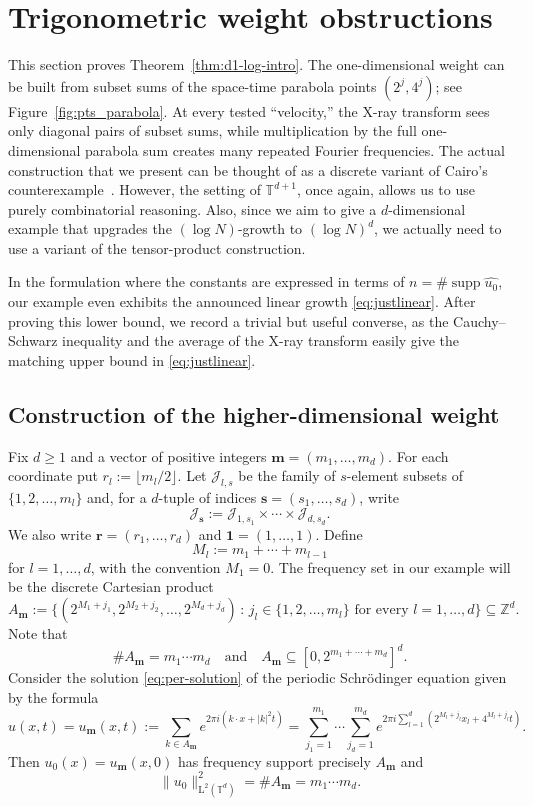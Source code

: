 \documentclass[11pt,reqno]{amsart}
\numberwithin{equation}{section}
\newcommand{\supp}{\operatorname{supp}}
\renewcommand{\ge}{\geqslant}
\begin{document}
\section{Trigonometric weight obstructions}
\label{sec:d1-log-weight}

This section proves Theorem~\ref{thm:d1-log-intro}. 
The one-dimensional weight can be built from subset sums of the space-time parabola points $(2^j,4^j)$; see Figure~\ref{fig:pts_parabola}. At every tested ``velocity,'' the X-ray transform sees only diagonal pairs of subset sums, while multiplication by the full one-dimensional parabola sum creates many repeated Fourier frequencies. 
The actual construction that we present can be thought of as a discrete variant of Cairo's counterexample~\cite{Cairo}. However, the setting of $\mathbb{T}^{d+1}$, once again, allows us to use purely combinatorial reasoning.
Also, since we aim to give a $d$-dimensional example that upgrades the $(\log N)$-growth to $(\log N)^d$, we actually need to use a variant of the tensor-product construction.

In the formulation where the constants are expressed in terms of $n=\#\supp\widehat{u_0}$, our example even exhibits the announced linear growth \eqref{eq:justlinear}. 
After proving this lower bound, we record a trivial but useful converse, as the Cauchy--Schwarz inequality and the average of the X-ray transform easily give the matching upper bound in \eqref{eq:justlinear}.

\subsection{Construction of the higher-dimensional weight}
Fix $d\ge1$ and a vector of positive integers $\mathbf{m}=(m_1,\ldots,m_d)$.
For each coordinate put $r_l:=\lfloor m_l/2\rfloor$. Let $\mathcal{J}_{l,s}$ be the family of $s$-element subsets of $\{1,2,\ldots,m_l\}$ and, for a $d$-tuple of indices $\mathbf{s}=(s_1,\ldots,s_d)$, write 
\[ \mathcal{J}_{\mathbf{s}}:=\mathcal{J}_{1,s_1}\times\cdots\times\mathcal{J}_{d,s_d}. \]
We also write $\mathbf{r}=(r_1,\ldots,r_d)$ and $\mathbf{1}=(1,\ldots,1)$.
Define
\[ M_l:=m_1+\cdots+m_{l-1} \]
for $l=1,\ldots,d$, with the convention $M_1=0$. The frequency set in our example will be the discrete Cartesian product
\[ A_{\mathbf{m}} := \bigl\{(2^{M_1+j_1},2^{M_2+j_2},\ldots,2^{M_d+j_d}) \,:\, j_l\in\{1,2,\ldots,m_l\}\text{ for every }l=1,\ldots,d\bigr\} \subseteq\mathbb{Z}^d. \]
Note that
\[ \#A_{\mathbf{m}}=m_1\cdots m_d \quad\text{and}\quad A_{\mathbf{m}}\subseteq[0,2^{m_1+\cdots+m_d}]^d. \]
Consider the solution \eqref{eq:per-solution} of the periodic Schr\"{o}dinger equation given by the formula
\begin{equation}\label{eq:logNsolution}
u(x,t) = u_{\mathbf{m}}(x,t) :=\sum_{k\in A_{\mathbf{m}}}e^{2\pi i(k\cdot x+|k|^2t)}
= \sum_{j_1=1}^{m_1} \cdots \sum_{j_d=1}^{m_d} e^{2\pi i\sum_{l=1}^d (2^{M_l+j_l}x_l+4^{M_l+j_l}t)}.
\end{equation}
Then $u_0(x) = u_{\mathbf{m}}(x,0)$ has frequency support precisely $A_{\mathbf{m}}$ and
\[ \|u_0\|_{\mathrm{L}^2(\mathbb{T}^d)}^2 = \#A_{\mathbf{m}} = m_1\cdots m_d. \]
\end{document}
